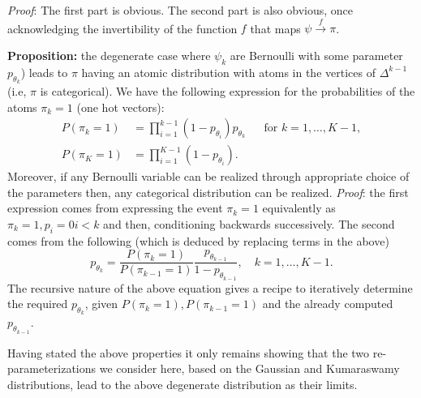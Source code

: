 \documentclass{article}
\begin{document}
\textit{Proof}: The first part is obvious. The second part is also obvious, once acknowledging the invertibility of the function $f$ that maps $\psi \xrightarrow{f} \pi$.

\textbf{Proposition:} the degenerate case where  $\psi_k$ are Bernoulli with some parameter $p_{\theta_k}$) leads to $\pi$ having an atomic distribution with atoms in the vertices of $\Delta^{k-1}$ (i.e, $\pi$ is categorical). We have the following expression for the probabilities of the atoms $\pi_k=1$ (one hot vectors):
\begin{align}
P(\pi_k =1)&= \prod_{i=1}^{k-1} (1-p_{\theta_i}) p_{\theta_k}  & &\text{for } k=1, \ldots, K-1,\\
P(\pi_K =1) &= \prod_{i=1}^{K-1} (1-p_{\theta_i}).
\end{align}
Moreover, if any Bernoulli variable can be realized through appropriate choice of the parameters then, any categorical distribution can be realized.
\textit{Proof}: the first expression comes from expressing the event $\pi_k=1$ equivalently as $\pi_k=1,p_i=0 i<k$ and then, conditioning backwards successively. The second comes from the following (which is deduced by replacing terms in the above)
$$ p_{\theta_k}=\frac{P(\pi_k =1)}{P(\pi_{k-1} =1)}\frac{p_{\theta_{k-1}}}{1-p_{\theta_{k-1}}},\quad k =1,\ldots, K-1.$$
The recursive nature of the above equation gives a recipe to iteratively determine the required $p_{\theta_k}$, given  $P(\pi_k =1), P(\pi_{k-1} =1)$ and the already computed $p_{\theta_{k-1}}$.

Having stated the above properties it only remains showing that the two re-parameterizations we consider here, based on the Gaussian and Kumaraswamy distributions, lead to the above degenerate distribution as their limits.
\end{document}
